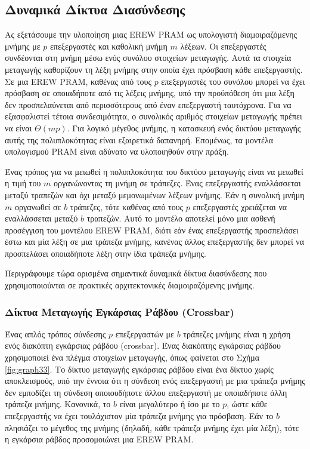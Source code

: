 \documentclass[12pt,a4paper]{article} %
\begin{document}
\subsection{Δυναμικά Δίκτυα Διασύνδεσης}
Ας εξετάσουμε την υλοποίηση μιας EREW PRAM ως υπολογιστή
διαμοιραζόμενης μνήμης με $p$ επεξεργαστές και καθολική μνήμη $m$ λέξεων. Οι επεξεργαστές
συνδέονται στη μνήμη μέσω ενός συνόλου στοιχείων μεταγωγής. Αυτά τα στοιχεία
μεταγωγής καθορίζουν τη λέξη μνήμης στην οποία έχει πρόσβαση κάθε επεξεργαστής.
Σε μια EREW PRAM, καθένας από τους $p$ επεξεργαστές του
συνόλου μπορεί να έχει πρόσβαση σε οποιαδήποτε από τις λέξεις μνήμης, υπό την
προϋπόθεση ότι μια λέξη δεν προσπελαύνεται από περισσότερους από έναν επεξεργαστή
ταυτόχρονα. Για να εξασφαλιστεί τέτοια συνδεσιμότητα, ο συνολικός αριθμός στοιχείων
μεταγωγής πρέπει να είναι $\Theta(mp)$. Για λογικό μέγεθος μνήμης, η κατασκευή ενός
δικτύου μεταγωγής αυτής της πολυπλοκότητας είναι εξαιρετικά δαπανηρή. Επομένως,
τα μοντέλα υπολογισμού PRAM είναι αδύνατο να υλοποιηθούν
στην πράξη.

Ένας τρόπος για να μειωθεί η πολυπλοκότητα του δικτύου μεταγωγής είναι να μειωθεί η τιμή του $m$
οργανώνοντας τη μνήμη σε τράπεζες. Ένας επεξεργαστής εναλλάσσεται μεταξύ τραπεζών
και όχι μεταξύ μεμονωμένων λέξεων μνήμης. Εάν η συνολική μνήμη $m$ οργανωθεί σε
$b$ τράπεζες, τότε καθένας από τους $p$ επεξεργαστές χρειάζεται να εναλλάσσεται
μεταξύ $b$ τραπεζών. Αυτό το μοντέλο αποτελεί μόνο μια ασθενή προσέγγιση του
μοντέλου EREW PRAM, διότι εάν ένας επεξεργαστής
προσπελάσει έστω και μία λέξη σε μια τράπεζα μνήμης, κανένας άλλος επεξεργαστής
δεν μπορεί να προσπελάσει οποιαδήποτε λέξη στην ίδια τράπεζα μνήμης.

Περιγράφουμε τώρα ορισμένα σημαντικά δυναμικά δίκτυα διασύνδεσης που
χρησιμοποιούνται σε πρακτικές αρχιτεκτονικές διαμοιραζόμενης μνήμης.

\subsubsection{Δίκτυα Μεταγωγής Εγκάρσιας Ράβδου (Crossbar)}
Ένας απλός τρόπος σύνδεσης $p$ επεξεργαστών με $b$ τράπεζες μνήμης είναι η χρήση
ενός διακόπτη εγκάρσιας ράβδου (crossbar). Ένας διακόπτης
εγκάρσιας ράβδου χρησιμοποιεί ένα πλέγμα στοιχείων μεταγωγής,
όπως φαίνεται στο Σχήμα \ref{fig:graph33}. Το δίκτυο μεταγωγής εγκάρσιας ράβδου
είναι ένα δίκτυο χωρίς αποκλεισμούς, υπό την έννοια ότι η σύνδεση ενός επεξεργαστή
με μια τράπεζα μνήμης δεν εμποδίζει τη σύνδεση οποιουδήποτε άλλου επεξεργαστή με
οποιαδήποτε άλλη τράπεζα μνήμης. Κανονικά, το $b$ είναι μεγαλύτερο ή ίσο με το $p$,
ώστε κάθε επεξεργαστής να έχει τουλάχιστον μία τράπεζα μνήμης για πρόσβαση. Εάν
το $b$ πλησιάζει το μέγεθος της μνήμης (δηλαδή, κάθε τράπεζα μνήμης έχει μία λέξη),
τότε η εγκάρσια ράβδος προσομοιώνει μια
EREW PRAM.
\end{document}
